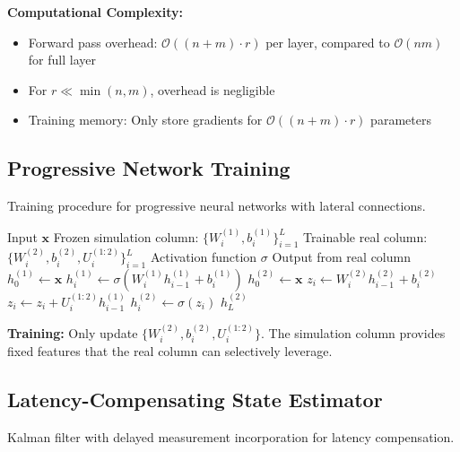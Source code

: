 \textbf{Computational Complexity:}
\begin{itemize}
    \item Forward pass overhead: $\mathcal{O}((n + m) \cdot r)$ per layer, compared to $\mathcal{O}(nm)$ for full layer
    \item For $r \ll \min(n, m)$, overhead is negligible
    \item Training memory: Only store gradients for $\mathcal{O}((n + m) \cdot r)$ parameters
\end{itemize}

\subsection{Progressive Network Training}

Training procedure for progressive neural networks with lateral connections.

\begin{algorithm}[H]
\caption{Progressive Network Forward Pass}
\label{alg:progressive_forward}
\begin{algorithmic}[1]
\REQUIRE Input $\mathbf{x}$
\REQUIRE Frozen simulation column: $\{W_i^{(1)}, b_i^{(1)}\}_{i=1}^{L}$
\REQUIRE Trainable real column: $\{W_i^{(2)}, b_i^{(2)}, U_i^{(1:2)}\}_{i=1}^{L}$
\REQUIRE Activation function $\sigma$
\ENSURE Output from real column
\STATE {}
\STATE $h_0^{(1)} \gets \mathbf{x}$
    \STATE $h_i^{(1)} \gets \sigma(W_i^{(1)} h_{i-1}^{(1)} + b_i^{(1)})$
\ENDFOR
\STATE
\STATE {}
\STATE $h_0^{(2)} \gets \mathbf{x}$
    \STATE $z_i \gets W_i^{(2)} h_{i-1}^{(2)} + b_i^{(2)}$ 
    \STATE $z_i \gets z_i + U_i^{(1:2)} h_{i-1}^{(1)}$ 
    \STATE $h_i^{(2)} \gets \sigma(z_i)$
\ENDFOR
\RETURN $h_L^{(2)}$
\end{algorithmic}
\end{algorithm}

\textbf{Training:} Only update $\{W_i^{(2)}, b_i^{(2)}, U_i^{(1:2)}\}$. The simulation column provides fixed features that the real column can selectively leverage.

\subsection{Latency-Compensating State Estimator}

Kalman filter with delayed measurement incorporation for latency compensation.

